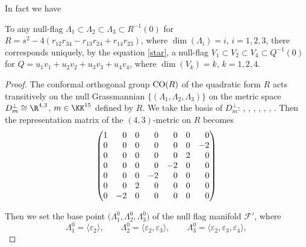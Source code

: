 In fact we have

\begin{Lemma}
To any null-flag $\Lambda_1 \subset \Lambda_2 \subset \Lambda_3 \subset R^{-1}(0)$
for $R = s^2 - 4(r_{12}r_{34} - r_{13}r_{24} + r_{14}r_{23})$, where $\dim(\Lambda_i) = i$, $i = 1, 2, 3$,
there corresponds uniquely, by the equation \eqref{star}, a null-flag $V_1 \subset V_2 \subset V_4 \subset Q^{-1}(0)$ for
$Q = u_1v_1 + u_2v_2 + u_3v_3 + u_4v_4$, where $\dim(V_k) = k$, $k = 1, 2, 4$.
\end{Lemma}

\begin{proof}
The conformal orthogonal group ${\rm CO}(R)$ of the quadratic form $R$ acts transitively
on the null Grassmannian $\{(\Lambda_1, \Lambda_2, \Lambda_3)\}$ on the metric space
$D^\perp_m \cong \R^{4,3}$, $m \in \KK^{15}$ defined by $R$.
We take the basis of $D_m^\perp$:
, ,
,
,
,
,
.
Then the representation matrix of the $(4, 3)$-metric on $R$ becomes
\[
\begin{pmatrix}
1 & \hphantom{-}0 & 0 & \hphantom{-}0 & \hphantom{-}0 & 0 & \hphantom{-}0
\\
0 & \hphantom{-}0 & 0 & \hphantom{-}0 & \hphantom{-}0 & 0 & -2
\\
0 & \hphantom{-}0 & 0 & \hphantom{-}0 & \hphantom{-}0 & 2 & \hphantom{-}0
\\
0 & \hphantom{-}0 & 0 & \hphantom{-}0 & -2 & 0 & \hphantom{-}0
\\
0 & \hphantom{-}0 & 0 & -2 & \hphantom{-}0 & 0 & \hphantom{-}0
\\
0 & \hphantom{-}0 & 2 & \hphantom{-}0 & \hphantom{-}0 & 0 & \hphantom{-}0
\\
0 & -2 & 0 & \hphantom{-}0 & \hphantom{-}0 & 0 & \hphantom{-}0
\end{pmatrix}
\]


Then we set
the base point $\bigl(\Lambda_1^0, \Lambda_2^0, \Lambda_3^0\bigr)$ of the null flag manifold
${\mathcal F}'$, where
\[
\Lambda_1^0 = \langle \varepsilon_2\rangle, \qquad
\Lambda_2^0 = \langle \varepsilon_2, \varepsilon_3\rangle, \qquad
\Lambda_3^0 = \langle \varepsilon_2, \varepsilon_3, \varepsilon_4\rangle,
\]


\end{proof}

